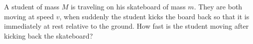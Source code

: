 A student of mass $M$ is traveling on his skateboard of mass $m$.
They are both moving at speed $v$, when suddenly the student kicks
the board back so that it is immediately at rest relative to the
ground. How fast is the student moving after kicking back the
skateboard?
